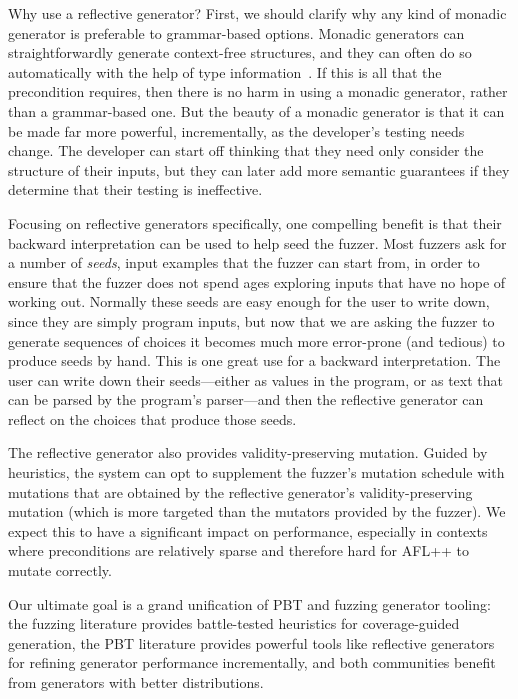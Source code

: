 Why use a reflective generator? First, we should clarify why any kind of monadic
generator is preferable to grammar-based options. Monadic generators can
straightforwardly generate context-free structures, and they can often do so
automatically with the help of type information~\cite{mista2019deriving}. If
this is all that the precondition requires, then there is no harm in using a
monadic generator, rather than a grammar-based one. But the beauty of a monadic
generator is that it can be made far more powerful, incrementally, as the
developer's testing needs change. The developer can start off thinking that they
need only consider the structure of their inputs, but they can later add more
semantic guarantees if they determine that their testing is ineffective.

Focusing on reflective generators specifically, one compelling benefit is that
their backward interpretation can be used to help seed the fuzzer.  Most fuzzers
ask for a number of {\em seeds}, input examples that the fuzzer can start from,
in order to ensure that the fuzzer does not spend ages exploring
inputs that have no hope of working out. Normally these seeds are easy enough
for the user to write down, since they are simply program inputs, but now that
we are asking the fuzzer to generate sequences of choices it becomes much more
error-prone (and tedious) to produce seeds by hand.  This is one great use for a
backward interpretation. The user can write down their seeds---either as values
in the program, or as text that can be parsed by the program's parser---and then
the reflective generator can reflect on the choices that produce those seeds.

The reflective generator also provides validity-preserving mutation. Guided by
heuristics, the system can opt to supplement the fuzzer's mutation schedule with
mutations that are obtained by the reflective generator's validity-preserving
mutation (which is more targeted than the mutators provided by the fuzzer). We
expect this to have a significant impact on performance, especially in contexts
where preconditions are relatively sparse and therefore hard for AFL++ to mutate
correctly.

Our ultimate goal is a grand unification of PBT and fuzzing generator tooling:
the fuzzing literature provides battle-tested heuristics for coverage-guided
generation, the PBT literature provides powerful tools like reflective
generators for refining generator performance incrementally, and both
communities benefit from generators with better distributions.

